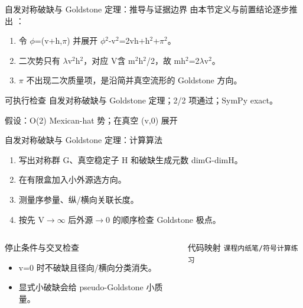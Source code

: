 \begin{frame}[t]{自发对称破缺与 Goldstone 定理：推导与证据边界}
\footnotesize
{}\quad 由本节定义与前置结论逐步推出 ：
\begin{enumerate}
\item 令 \ensuremath{\phi}=(v+h,\ensuremath{\pi}) 并展开 \ensuremath{\phi}\ensuremath{^{2}}-v\ensuremath{^{2}}=2vh+h\ensuremath{^{2}}+\ensuremath{\pi}\ensuremath{^{2}}。
\item 二次势只有 \ensuremath{\lambda}v\ensuremath{^{2}}h\ensuremath{^{2}}，对应 V含 m\ensuremath{^{2}}h\ensuremath{^{2}}/\allowbreak{}2，故 mh\ensuremath{^{2}}=2\ensuremath{\lambda}v\ensuremath{^{2}}。
\item \ensuremath{\pi} 不出现二次质量项，是沿简并真空流形的 Goldstone 方向。
\end{enumerate}\begin{block}{可执行检查}
\quad 自发对称破缺与 Goldstone 定理；2/2 项通过；SymPy exact。
\par\scriptsize 假设：O(2) Mexican-hat 势；在真空 (v,0) 展开
\end{block}
\end{frame}

\begin{frame}[t]{自发对称破缺与 Goldstone 定理：计算算法}
\footnotesize
{}\begin{enumerate}
\item 写出对称群 G、真空稳定子 H 和破缺生成元数 dimG-dimH。
\item 在有限盒加入小外源选方向。
\item 测量序参量、纵/\allowbreak{}横向关联长度。
\item 按先 V\ensuremath{\rightarrow}\ensuremath{\infty} 后外源\ensuremath{\rightarrow}0 的顺序检查 Goldstone 极点。
\end{enumerate}\begin{columns}[T,onlytextwidth]
\begin{block}{停止条件与交叉检查}\scriptsize\begin{itemize}
\item[\CheckMark] v=0 时不破缺且径向/\allowbreak{}横向分类消失。
\item[\CheckMark] 显式小破缺会给 pseudo-Goldstone 小质量。
\end{itemize}\end{block}
\begin{block}{代码映射}
\scriptsize \texttt{课程内纸笔/\allowbreak{}符号计算练习}
\end{block}\end{columns}\end{frame}

